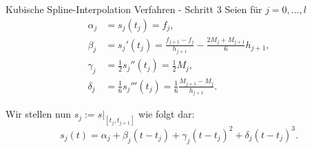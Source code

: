 \begin{karte}{Kubische Spline-Interpolation Verfahren - Schritt 3}
	Seien für \( j = 0,\ldots, l \)
	\begin{align*}
		\alpha_j &= s_j(t_j) = f_j, \\
		\beta_j &= s_j'(t_j) = \frac{f_{j+1} - f_j}{h_{j+1}} - \frac{2M_j + M_{j+1}}{6}h_{j+1}, \\
		\gamma_j &= \frac{1}{2} s_j''(t_j) = \frac{1}{2} M_j, \\
		\delta_j &= \frac{1}{6} s_j'''(t_j) = \frac{1}{6} \frac{M_{j+1} - M_j}{h_{j+1}}.
	\end{align*}

	Wir stellen nun \( s_j := s|_{[t_j, t_{j+1}]} \) wie folgt dar:
	\[ s_j(t) = \alpha_j + \beta_j(t - t_j) + \gamma_j(t - t_j)^2 + \delta_j(t - t_j)^3. \]
\end{karte}